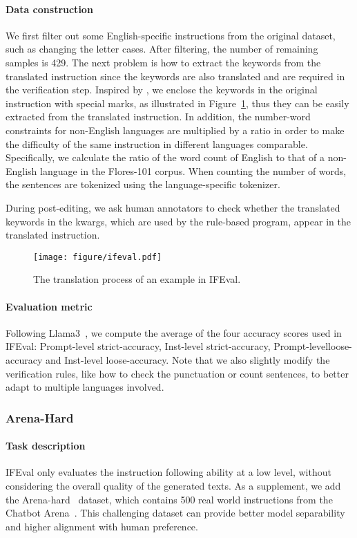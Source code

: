 \paragraph{Data construction}
We first filter out some English-specific instructions from the original dataset, such as changing the letter cases.
After filtering, the number of remaining samples is 429.
The next problem is how to extract the keywords from the translated instruction since the keywords are also translated and are required in the verification step.
Inspired by \citet{yuan-etal-2020-enhancing}, we enclose the keywords in the original instruction with special marks, as illustrated in Figure~\ref{fig:ifeval}, thus they can be easily extracted from the translated instruction.
In addition, the number-word constraints for non-English languages are multiplied by a ratio in order to make the difficulty of the same instruction in different languages comparable.
Specifically, we calculate the ratio of the word count of English to that of a non-English language in the Flores-101 corpus.
When counting the number of words, the sentences are tokenized using the language-specific tokenizer.

During post-editing, we ask human annotators to check whether the translated keywords in the kwargs, which are used by the rule-based program, appear in the translated instruction.

\begin{figure}
    \centering
    \texttt{[image: figure/ifeval.pdf]}
    \caption{The translation process of an example in IFEval.}
    \label{fig:ifeval}
\end{figure}

\paragraph{Evaluation metric}
Following Llama3~\cite{dubey2024llama}, we compute the average of the four accuracy scores used in IFEval: Prompt-level strict-accuracy, Inst-level strict-accuracy, Prompt-levelloose-accuracy and Inst-level loose-accuracy.
Note that we also slightly modify the verification rules, like how to check the punctuation or count sentences, to better adapt to multiple languages involved.

\subsubsection{Arena-Hard}
\paragraph{Task description}
IFEval only evaluates the instruction following ability at a low level, without considering the overall quality of the generated texts.
As a supplement, we add the Arena-hard~\cite{li2024crowdsourced} dataset, which contains 500 real world instructions from the Chatbot Arena~\cite{chiang2024chatbot}.
This challenging dataset can provide better model separability and higher alignment with human preference.

